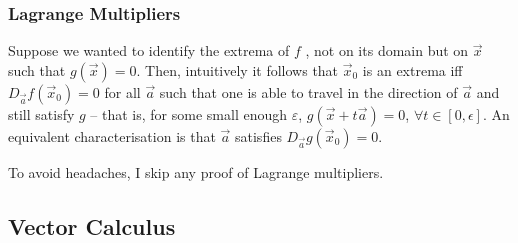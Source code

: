 \documentclass{article}
\theoremstyle{definition}
\begin{document}
\subsubsection{Lagrange Multipliers}
Suppose we wanted to identify the extrema of $f$ , not on its domain but on $\vec x$ such that $g(\vec x)=0$. Then, intuitively it follows that $\vec x_0$ is an extrema iff $D_{\vec a}f(\vec x_0)=0$ for all $\vec a$ such that one is able to travel in the direction of $\vec a$ and still satisfy $g$ -- that is, for some small enough $\varepsilon$, $g(\vec x+t\vec a)=0$, $\forall t\in[0,\epsilon]$. An equivalent characterisation is that $\vec a$ satisfies $D_{\vec a}g(\vec x_0)=0$.

To avoid headaches, I skip any proof of Lagrange multipliers.

\subsection{Vector Calculus}
\end{document}

